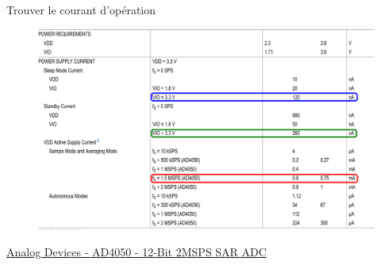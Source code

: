 \begin{frame}{Trouver le courant d'opération}
    \begin{figure}
        \includegraphics[width=\textwidth, height=0.75\textheight, keepaspectratio]{pictures/ad4050-power.png}
    \end{figure}
    \href{https://www.analog.com/media/en/technical-documentation/data-sheets/ad4050-ad4056.pdf}{Analog Devices - AD4050 - 12-Bit 2MSPS SAR ADC}
\end{frame}

